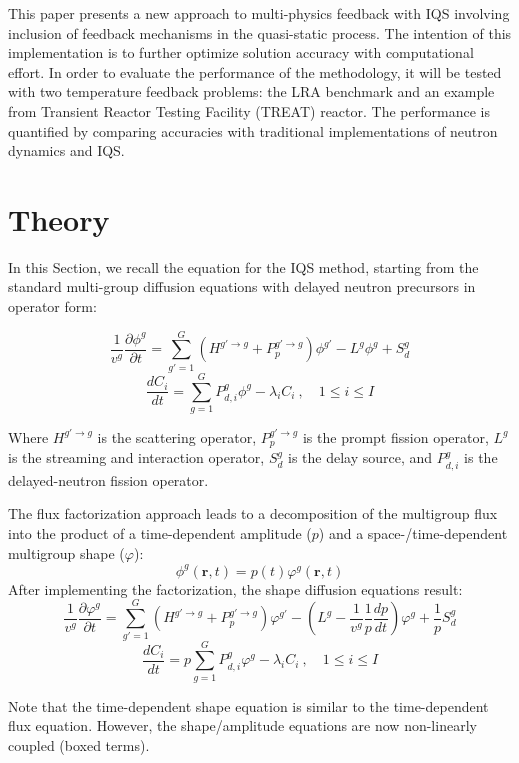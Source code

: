 \documentclass{anstrans}
\renewcommand{\vec}[1]{\bm{#1}} %
\newcommand{\be}{\begin{equation}}
\newcommand{\ee}{\end{equation}}
\begin{document}
This paper presents a new approach to multi-physics feedback with IQS involving inclusion of feedback mechanisms in the quasi-static process.  The intention of this implementation is to further optimize solution accuracy with computational effort.  In order to evaluate the performance of the methodology, it will be tested with two temperature feedback problems: the LRA benchmark and an example from Transient Reactor Testing Facility (TREAT) reactor.  The performance is quantified by comparing accuracies with traditional implementations of neutron dynamics and IQS.

\section{Theory}

In this Section, we recall the equation for the IQS method, starting from the standard multi-group diffusion equations with delayed neutron precursors in operator form:

\be
\frac{1}{v^g}\frac{\partial \phi^g}{\partial t} = \sum_{g'=1}^G \left(H^{g'\to g} + P_p^{g' \to g} \right) \phi^{g'} - L^g\phi^g + S_{d}^g
\label{eq:flux}
\ee 
\be
\frac{dC_i}{dt} = \sum_{g=1}^G P_{d,i}^g \phi^{g} - \lambda_i C_i \ , \quad 1 \le i \le I 
\label{eq:precursor}
\ee

Where $H^{g'\to g}$ is the scattering operator, $P_p^{g' \to g}$ is the prompt fission operator, $L^g$ is the streaming and interaction operator, 
$S_{d}^g$ is the delay source, and $P_{d,i}^g$ is the delayed-neutron fission operator.

The flux factorization approach leads to a decomposition of the multigroup flux into the product of a time-dependent amplitude ($p$) and a space-/time-dependent 
multigroup shape ($\varphi$):
\be
\phi^g(\vec{r},t)=p(t)\varphi^g(\vec{r},t)
\ee
After implementing the factorization, the shape diffusion equations result:
\be
\frac{1}{v^g}\frac{\partial \varphi^g}{\partial t} = \sum_{g'=1}^G \left(H^{g'\to g} + P_p^{g' \to g} \right) \varphi^{g'} - \left(L^g - \boxed{\frac{1}{v^g}\frac{1}{p}\frac{dp}{dt}}\right)\varphi^g + \boxed{\frac{1}{p}}S_{d}^g
\label{eq:shape}
\ee 
\be
\frac{dC_i}{dt} = \boxed{p}\sum_{g=1}^G P_{d,i}^g \varphi^{g} - \lambda_i C_i \ , \quad 1 \le i \le I 
\label{eq:prec}
\ee

Note that the time-dependent shape equation is similar to the time-dependent flux equation. 
However, the shape/amplitude equations are now non-linearly coupled (boxed terms).
\end{document}

